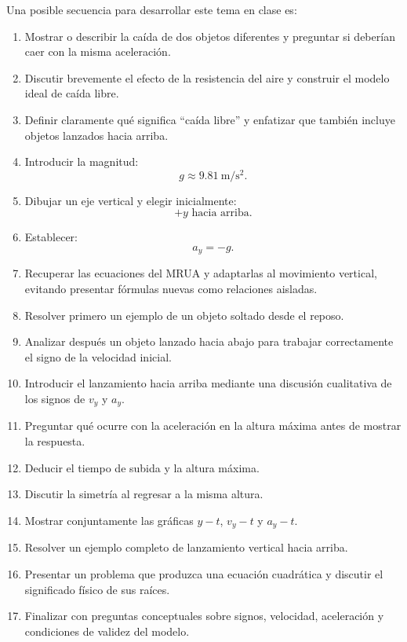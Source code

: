 \begin{notapedagogica}
Una posible secuencia para desarrollar este tema en clase es:

\begin{enumerate}
    \item Mostrar o describir la caída de dos objetos diferentes y preguntar si deberían caer con la misma aceleración.

    \item Discutir brevemente el efecto de la resistencia del aire y construir el modelo ideal de caída libre.

    \item Definir claramente qué significa ``caída libre'' y enfatizar que también incluye objetos lanzados hacia arriba.

    \item Introducir la magnitud:
    \[
    g\approx\SI{9.81}{\meter\per\second\squared}.
    \]

    \item Dibujar un eje vertical y elegir inicialmente:
    \[
    +y\text{ hacia arriba}.
    \]

    \item Establecer:
    \[
    a_y=-g.
    \]

    \item Recuperar las ecuaciones del MRUA y adaptarlas al movimiento vertical, evitando presentar fórmulas nuevas como relaciones aisladas.

    \item Resolver primero un ejemplo de un objeto soltado desde el reposo.

    \item Analizar después un objeto lanzado hacia abajo para trabajar correctamente el signo de la velocidad inicial.

    \item Introducir el lanzamiento hacia arriba mediante una discusión cualitativa de los signos de \(v_y\) y \(a_y\).

    \item Preguntar qué ocurre con la aceleración en la altura máxima antes de mostrar la respuesta.

    \item Deducir el tiempo de subida y la altura máxima.

    \item Discutir la simetría al regresar a la misma altura.

    \item Mostrar conjuntamente las gráficas \(y-t\), \(v_y-t\) y \(a_y-t\).

    \item Resolver un ejemplo completo de lanzamiento vertical hacia arriba.

    \item Presentar un problema que produzca una ecuación cuadrática y discutir el significado físico de sus raíces.

    \item Finalizar con preguntas conceptuales sobre signos, velocidad, aceleración y condiciones de validez del modelo.
\end{enumerate}
\end{notapedagogica}



